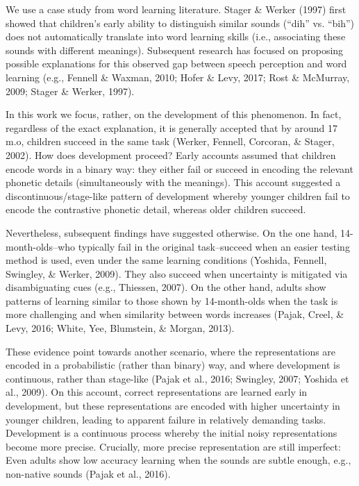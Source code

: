 \documentclass[10pt, letterpaper]{article}
\begin{document}
We use a case study from word learning literature. Stager \& Werker
(1997) first showed that children's early ability to distinguish similar
sounds (``dih'' vs. ``bih'') does not automatically translate into word
learning skills (i.e., associating these sounds with different
meanings). Subsequent research has focused on proposing possible
explanations for this observed gap between speech perception and word
learning (e.g., Fennell \& Waxman, 2010; Hofer \& Levy, 2017; Rost \&
McMurray, 2009; Stager \& Werker, 1997).

In this work we focus, rather, on the development of this phenomenon. In
fact, regardless of the exact explanation, it is generally accepted that
by around 17 m.o, children succeed in the same task (Werker, Fennell,
Corcoran, \& Stager, 2002). How does development proceed? Early accounts
assumed that children encode words in a binary way: they either fail or
succeed in encoding the relevant phonetic details (simultaneously with
the meanings). This account suggested a discontinuous/stage-like pattern
of development whereby younger children fail to encode the contrastive
phonetic detail, whereas older children succeed.

Nevertheless, subsequent findings have suggested otherwise. On the one
hand, 14-month-olds--who typically fail in the original task--succeed
when an easier testing method is used, even under the same learning
conditions (Yoshida, Fennell, Swingley, \& Werker, 2009). They also
succeed when uncertainty is mitigated via disambiguating cues (e.g.,
Thiessen, 2007). On the other hand, adults show patterns of learning
similar to those shown by 14-month-olds when the task is more
challenging and when similarity between words increases (Pajak, Creel,
\& Levy, 2016; White, Yee, Blumstein, \& Morgan, 2013).

These evidence point towards another scenario, where the representations
are encoded in a probabilistic (rather than binary) way, and where
development is continuous, rather than stage-like (Pajak et al., 2016;
Swingley, 2007; Yoshida et al., 2009). On this account, correct
representations are learned early in development, but these
representations are encoded with higher uncertainty in younger children,
leading to apparent failure in relatively demanding tasks. Development
is a continuous process whereby the initial noisy representations become
more precise. Crucially, more precise representation are still
imperfect: Even adults show low accuracy learning when the sounds are
subtle enough, e.g., non-native sounds (Pajak et al., 2016).
\end{document}
